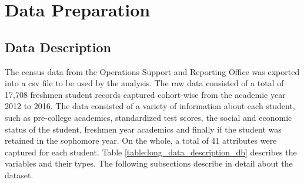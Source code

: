\documentclass[11pt,openright]{report}
\begin{document}
\section {Data Preparation}
\subsection{Data Description}
The census data from the Operations Support and Reporting Office was exported into a csv file to be used by the analysis. The raw data consisted of a total of 17,708 freshmen student records captured cohort-wise from the academic year 2012 to 2016. The data consisted of a variety of information about each student, such as pre-college academics, standardized test scores, the social and economic status of the student, freshmen year academics and finally if the student was retained in the sophomore year. On the whole, a total of 41 attributes were captured for each student. Table \ref{table:long_data_description_db} describes the variables and their types. The following subsections describe in detail about the dataset. 
\end{document}
